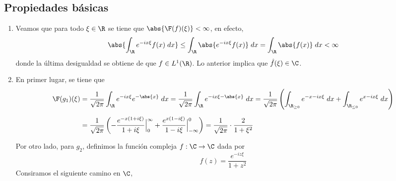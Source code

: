 \documentclass{article}
\begin{document}
\subsection{Propiedades básicas}
\begin{enumerate}
    \item Veamos que para todo $\xi\in\R$ se tiene que $\abs{\F(f)(\xi)}<\infty$, en efecto,
    \begin{equation*}
        \abs{\int_{\R}e^{-ix\xi}f(x)\hspace{1mm}dx}\leq\int_{\R}\abs{e^{-ix\xi}f(x)}\hspace{1mm}dx
        =\int_{\R}\abs{f(x)}\hspace{1mm}dx<\infty
    \end{equation*}
    donde la última desigualdad se obtiene de que $f\in L^{1}(\R)$. Lo anterior implica que 
    $\hat{f}(\xi)\in\C$.

    \item En primer lugar, se tiene que
    \begin{align*}
        \F(g_{1})(\xi) &= \frac{1}{\sqrt{2\pi}}\int_{\R}e^{-ix\xi}e^{-\abs{x}}\hspace{1mm}dx
        =\frac{1}{\sqrt{2\pi}}\int_{\R}e^{-ix\xi-\abs{x}}\hspace{1mm}dx
        =\frac{1}{\sqrt{2\pi}}\left(\int_{\R_{\geq0}}e^{-x-ix\xi}\hspace{1mm}dx
        +\int_{\R_{\leq0}}e^{x-ix\xi}\hspace{1mm}dx\right) \\[2mm]
        &= \frac{1}{\sqrt{2\pi}}\left(-\frac{e^{-x(1+i\xi)}}{1+i\xi}\Big|_{0}^{\infty}
        +\frac{e^{x(1-i\xi)}}{1-i\xi}\Big|_{-\infty}^{0}\right)
        =\frac{1}{\sqrt{2\pi}}\cdot\frac{2}{1+\xi^{2}}
    \end{align*}

    \vspace{2mm}
    Por otro lado, para $g_{2}$, definimos la función compleja $f:\C\to\C$ dada por
    \begin{equation*}
        f(z)=\frac{e^{-iz\xi}}{1+z^{2}}
    \end{equation*}
    Consiramos el siguiente camino en $\C$,
    \begin{center}
\end{center}
\end{enumerate}
\end{document}
